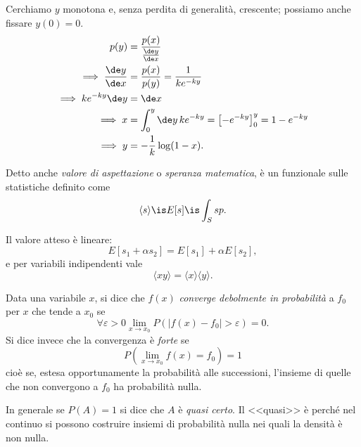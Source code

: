 \begin{solution}
	Cerchiamo $y$ monotona e, senza perdita di generalità, crescente; possiamo anche fissare $y(0) = 0$.
	\begin{align*}
		p(y) &= \frac{p(x)}{\frac{\de y}{\de x}} \\
		\implies \frac{\de y}{\de x} &= \frac{p(x)}{p(y)} = \frac{1}{ke^{-ky}}\\
		\implies ke^{-ky}\de y &= \de x \\
		\implies x &= \int_{0}^{y} \de y\, ke^{-ky} = \left[ -e^{-ky} \right]_{0}^{y} = 1 - e^{-ky} \\
		\implies y &= -\frac1k \log(1-x).
	\end{align*}
\end{solution}

\begin{definition}
	Detto anche \emph{valore di aspettazione} o \emph{speranza matematica},
	è un funzionale sulle statistiche definito come
	\begin{equation*}
		\langle s \rangle \is E[s] \is \int_S sp.
	\end{equation*}
\end{definition}

\noindent Il valore atteso è lineare:
\begin{equation*}
	E[s_1+\alpha s_2] = E[s_1] + \alpha E[s_2],
\end{equation*}
e per variabili indipendenti vale
\begin{equation*}
	\langle xy \rangle = \langle x \rangle \langle y \rangle.
\end{equation*}

\begin{definition}
	Data una variabile $x$, si dice che $f(x)$ \emph{converge debolmente in probabilità} a $f_0$ per $x$ che tende a $x_0$ se
	\begin{equation*}
		\forall\varepsilon > 0 \lim_{x\to x_0} P\left( \left| f(x) - f_0 \right| > \varepsilon \right) = 0.
	\end{equation*}
	Si dice invece che la convergenza è \emph{forte} se
	\begin{equation*}
		P\left( \lim_{x\to x_0} f(x) = f_0 \right) = 1
	\end{equation*}
	cioè se, estesa opportunamente la probabilità alle successioni, l'insieme di quelle che non convergono a $f_0$ ha probabilità nulla.
\end{definition}

In generale se $P(A)=1$ si dice che $A$ è \emph{quasi certo}. Il <<quasi>> è perché nel continuo si possono costruire insiemi di probabilità nulla nei quali la densità è non nulla.

